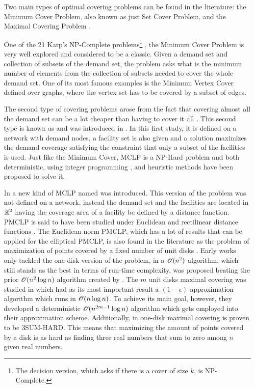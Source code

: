 Two main types of optimal covering problems can be found in the literature: the Minimum Cover Problem, also known as just Set Cover Problem, and the Maximal Covering Problem \cite{karatas}. 

One of the 21 Karp's NP-Complete problems\footnote{The decision version, which asks if there is a cover of size $k$, is NP-Complete.} \cite{karp}, the Minimum Cover Problem is very well explored and considered to be a classic. 
Given a demand set and collection of subsets of the demand set, the problem asks what is the minimum number of elements from the collection of subsets needed to cover the whole demand set. One of its most famous examples is the Minimum Vertex Cover defined over graphs, where the vertex set has to be covered by a subset of edges.

The second type of covering problems arose from the fact that covering almost all the demand set can be a lot cheaper than having to cover it all \cite{garcia}. This second type is known as  and was introduced in \cite{church:1974}. In this first study, it is defined on a network with demand nodes, a facility set is also given and a solution maximizes the demand coverage satisfying the constraint that only a subset of the facilities is used. Just like the Minimum Cover, MCLP is a NP-Hard problem \cite{hatta:2013} and both deterministic, using integer programming \cite{church:1974}, and heuristic methods \cite{revelle:2008} have been proposed to solve it.

In \cite{church:1984} a new kind of MCLP named  was introduced. This version of the problem was not defined on a network, instead the demand set and the facilities are located in $\mathbb{R}^2$ having the coverage area of a facility be defined by a distance function. PMCLP is said to have been studied under Euclidean and rectilinear distance functions \cite{younies}. The Euclidean norm PMCLP, which has a lot of results that can be applied for the elliptical PMCLP, is also found in the literature as the problem of maximization of points covered by a fixed number of unit disks \cite{cabello:2006}. 
Early works only tackled the one-disk version of the problem, in \cite{chazelle:1986} a $\mathscr{O}(n^2)$ algorithm, which still stands as the best in terms of run-time complexity, was proposed beating the prior $\mathscr{O}(n^2\log{n})$ algorithm created by \cite{drezner}.
The $m$ unit disks maximal covering was studied in \cite{cabello:2006} which had as its most important result a $(1-\epsilon)$-approximation algorithm which runs in $\mathscr{O}(n\log{n})$. To achieve its main goal, however, they developed a deterministic $\mathscr{O}(n^{2m-1}\log{n})$ algorithm which gets employed into their approximation scheme.
Additionally, in \cite{aronov:2008} one-disk maximal covering is proven to be 3SUM-HARD. This means that maximizing the amount of points covered by a disk is as hard as finding three real numbers that sum to zero among $n$ given real numbers.

